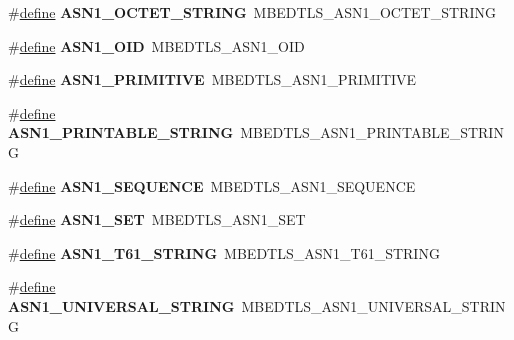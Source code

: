 \begin{DoxyCompactItemize}
\#\hyperlink{structdefine}{define} {\bfseries A\+S\+N1\+\_\+\+O\+C\+T\+E\+T\+\_\+\+S\+T\+R\+I\+NG}~M\+B\+E\+D\+T\+L\+S\+\_\+\+A\+S\+N1\+\_\+\+O\+C\+T\+E\+T\+\_\+\+S\+T\+R\+I\+NG
\item 
\mbox{\label{compat-1_83_8h_a3fef844d0ea67080b66b3a4d5f0a9ec8}} 
\#\hyperlink{structdefine}{define} {\bfseries A\+S\+N1\+\_\+\+O\+ID}~M\+B\+E\+D\+T\+L\+S\+\_\+\+A\+S\+N1\+\_\+\+O\+ID
\item 
\mbox{\label{compat-1_83_8h_ad61fcc873df5268453d3064aa11ffbca}} 
\#\hyperlink{structdefine}{define} {\bfseries A\+S\+N1\+\_\+\+P\+R\+I\+M\+I\+T\+I\+VE}~M\+B\+E\+D\+T\+L\+S\+\_\+\+A\+S\+N1\+\_\+\+P\+R\+I\+M\+I\+T\+I\+VE
\item 
\mbox{\label{compat-1_83_8h_a9d250073c32cfa2d0f90a92fa9485c89}} 
\#\hyperlink{structdefine}{define} {\bfseries A\+S\+N1\+\_\+\+P\+R\+I\+N\+T\+A\+B\+L\+E\+\_\+\+S\+T\+R\+I\+NG}~M\+B\+E\+D\+T\+L\+S\+\_\+\+A\+S\+N1\+\_\+\+P\+R\+I\+N\+T\+A\+B\+L\+E\+\_\+\+S\+T\+R\+I\+NG
\item 
\mbox{\label{compat-1_83_8h_a9321fc9f2a5ef4103008fbe5c4b230df}} 
\#\hyperlink{structdefine}{define} {\bfseries A\+S\+N1\+\_\+\+S\+E\+Q\+U\+E\+N\+CE}~M\+B\+E\+D\+T\+L\+S\+\_\+\+A\+S\+N1\+\_\+\+S\+E\+Q\+U\+E\+N\+CE
\item 
\mbox{\label{compat-1_83_8h_aaa4097914560e5318d1c316106b38998}} 
\#\hyperlink{structdefine}{define} {\bfseries A\+S\+N1\+\_\+\+S\+ET}~M\+B\+E\+D\+T\+L\+S\+\_\+\+A\+S\+N1\+\_\+\+S\+ET
\item 
\mbox{\label{compat-1_83_8h_aecb31acd8c2e58371f4cc5163f13ee3e}} 
\#\hyperlink{structdefine}{define} {\bfseries A\+S\+N1\+\_\+\+T61\+\_\+\+S\+T\+R\+I\+NG}~M\+B\+E\+D\+T\+L\+S\+\_\+\+A\+S\+N1\+\_\+\+T61\+\_\+\+S\+T\+R\+I\+NG
\item 
\mbox{\label{compat-1_83_8h_a7571a2e3383313e9a36cf168b707b4f9}} 
\#\hyperlink{structdefine}{define} {\bfseries A\+S\+N1\+\_\+\+U\+N\+I\+V\+E\+R\+S\+A\+L\+\_\+\+S\+T\+R\+I\+NG}~M\+B\+E\+D\+T\+L\+S\+\_\+\+A\+S\+N1\+\_\+\+U\+N\+I\+V\+E\+R\+S\+A\+L\+\_\+\+S\+T\+R\+I\+NG
\item 
\mbox{\label{compat-1_83_8h_a94a96a45489af8cb19d6dd3ee76eefb2}} 

\end{DoxyCompactItemize}
